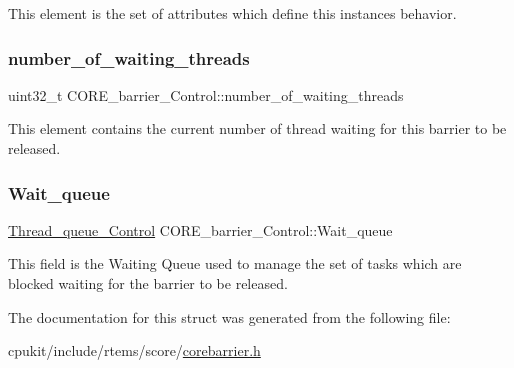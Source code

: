 This element is the set of attributes which define this instance\textquotesingle{}s behavior. \mbox{\label{structCORE__barrier__Control_a259a5706cc66db9c750a041664d09ded}} 
\subsubsection{\texorpdfstring{number\_of\_waiting\_threads}{number\_of\_waiting\_threads}}
{\footnotesize\ttfamily uint32\+\_\+t C\+O\+R\+E\+\_\+barrier\+\_\+\+Control\+::number\+\_\+of\+\_\+waiting\+\_\+threads}

This element contains the current number of thread waiting for this barrier to be released. \mbox{\label{structCORE__barrier__Control_acee48d31f1cbe640af9b8def2246ab3a}} 
\subsubsection{\texorpdfstring{Wait\_queue}{Wait\_queue}}
{\footnotesize\ttfamily \mbox{\hyperlink{structThread__queue__Control}{Thread\+\_\+queue\+\_\+\+Control}} C\+O\+R\+E\+\_\+barrier\+\_\+\+Control\+::\+Wait\+\_\+queue}

This field is the Waiting Queue used to manage the set of tasks which are blocked waiting for the barrier to be released. 

The documentation for this struct was generated from the following file\+:\begin{DoxyCompactItemize}
\item 
cpukit/include/rtems/score/\mbox{\hyperlink{corebarrier_8h}{corebarrier.\+h}}\end{DoxyCompactItemize}
